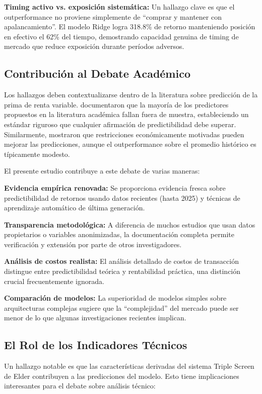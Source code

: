 \documentclass[11pt,a4paper]{article}
\begin{document}
\textbf{Timing activo vs. exposición sistemática:} Un hallazgo clave es que el outperformance no proviene simplemente de ``comprar y mantener con apalancamiento''. El modelo Ridge logra 318.8\% de retorno manteniendo posición en efectivo el 62\% del tiempo, demostrando capacidad genuina de timing de mercado que reduce exposición durante períodos adversos.

\subsection{Contribución al Debate Académico}

Los hallazgos deben contextualizarse dentro de la literatura sobre predicción de la prima de renta variable. \citet{welch2008} documentaron que la mayoría de los predictores propuestos en la literatura académica fallan fuera de muestra, estableciendo un estándar riguroso que cualquier afirmación de predictibilidad debe superar. Similarmente, \citet{campbell2008} mostraron que restricciones económicamente motivadas pueden mejorar las predicciones, aunque el outperformance sobre el promedio histórico es típicamente modesto.

El presente estudio contribuye a este debate de varias maneras:

\textbf{Evidencia empírica renovada:} Se proporciona evidencia fresca sobre predictibilidad de retornos usando datos recientes (hasta 2025) y técnicas de aprendizaje automático de última generación.

\textbf{Transparencia metodológica:} A diferencia de muchos estudios que usan datos propietarios o variables anonimizadas, la documentación completa permite verificación y extensión por parte de otros investigadores.

\textbf{Análisis de costos realista:} El análisis detallado de costos de transacción distingue entre predictibilidad teórica y rentabilidad práctica, una distinción crucial frecuentemente ignorada.

\textbf{Comparación de modelos:} La superioridad de modelos simples sobre arquitecturas complejas sugiere que la ``complejidad'' del mercado puede ser menor de lo que algunas investigaciones recientes implican.

\subsection{El Rol de los Indicadores Técnicos}

Un hallazgo notable es que las características derivadas del sistema Triple Screen de Elder contribuyen a las predicciones del modelo. Esto tiene implicaciones interesantes para el debate sobre análisis técnico:
\end{document}

